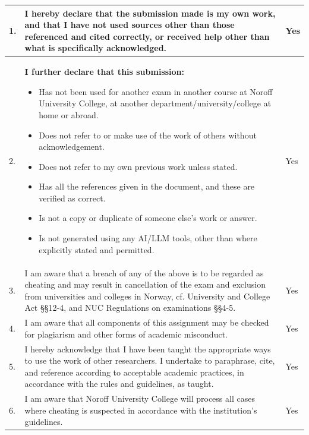 \begin{center}
\begin{tabular}{|p{0.5cm}|p{13cm}|p{1cm}|}
 \hline  
 1. & I hereby declare that the submission made is my own work, and that I have not used sources other than those referenced and cited correctly, or received help other than what is specifically acknowledged.  & Yes \\
 \hline
 2. & \textbf{I further declare that this submission:}
 \begin{itemize}[nosep]
    \item Has not been used for another exam in another course at Noroff University College, at another department/university/college at home or abroad.
    \item Does not refer to or make use of the work of others without acknowledgement.
    \item Does not refer to my own previous work unless stated.
    \item Has all the references given in the document, and these are verified as correct.
    \item Is not a copy or duplicate of someone else's work or answer.
    \item Is not generated using any AI/LLM tools, other than where explicitly stated and permitted.
 \end{itemize}& Yes \\ %
 \hline
 3. & I am aware that a breach of any of the above is to be regarded as cheating and may result in cancellation of the exam and exclusion from universities and colleges in Norway, cf. University and College Act §§12-4, and NUC Regulations on examinations §§4-5.
 & Yes \\
 \hline
 4. & I am aware that all components of this assignment may be checked for plagiarism and other forms of academic misconduct. 
 & Yes \\
 \hline
  5. &  I hereby acknowledge that I have been taught the appropriate ways to use the work of other researchers. I undertake to paraphrase, cite, and reference according to acceptable academic practices, in accordance with the rules and guidelines, as taught.
 & Yes \\
 \hline
 6. & I am aware that Noroff University College will process all cases where cheating is suspected in accordance with the institution's guidelines.
 & Yes \\
 \hline
\end{tabular}
\end{center}
